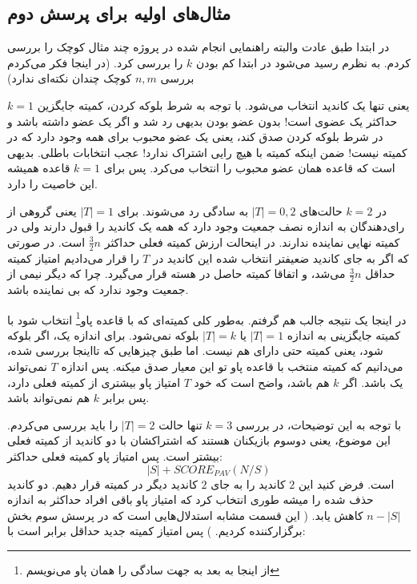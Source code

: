 \documentclass[12pt]{article}
\begin{document}
\subsection{مثال‌های اولیه برای پرسش دوم}
در ابتدا طبق عادت والبته راهنمایی انجام شده در پروژه چند مثال
کوچک را بررسی کردم. به نظرم رسید می‌شود در ابتدا کم بودن $k$
را بررسی کرد. (در اینجا فکر می‌کردم بررسی 
$n,m$ 
کوچک
چندان نکته‌ای ندارد)

 $k=1$
 یعنی تنها یک کاندید انتخاب می‌شود. با توجه به شرط بلوکه کردن،
 کمیته جایگزین حداکثر یک عضوی است! بدون عضو بودن بدیهی رد شد و
 اگر یک عضو  داشته باشد و در شرط بلوکه کردن صدق کند،
 یعنی یک عضو محبوب برای همه وجود دارد که در کمیته نیست! ضمن اینکه
 کمیته با هیچ رایی اشتراک ندارد! عجب انتخابات باطلی. بدیهی است که
 قاعده
 همان عضو محبوب را انتخاب می‌کرد. پس برای $k=1$ 
 قاعده همیشه این خاصیت را دارد.

 در $k=2$ حالت‌های 
 $|T| = 0, 2$
 به سادگی رد می‌شوند. برای 
 $|T| =1$ یعنی
 گروهی از رای‌دهندگان به اندازه نصف جمعیت وجود دارد که همه یک کاندید
  را قبول دارند ولی در کمیته نهایی نماینده ندارند. در اینحالت
  ارزش کمیته فعلی حداکثر $\frac{3}{2}n$
  است. در صورتی که اگر به جای کاندید ضعیفتر انتخاب شده
  این کاندید در $T$
  را قرار می‌دادیم امتیاز کمیته حداقل
  $\frac{3}{2}n$
  می‌شد، و اتفاقا کمیته حاصل در هسته قرار می‌گیرد. چرا که دیگر نیمی از جمعیت
  وجود ندارد که بی نماینده باشد.

  در اینجا یک نتیجه جالب هم گرفتم. به‌طور کلی کمیته‌ای که با
  قاعده پاو\footnote{از اینجا به بعد به جهت سادگی  را همان پاو می‌نویسم}
  انتخاب شود با کمیته جایگزینی به اندازه
  $|T| =1$
  یا 
  $|T| = k$
  بلوکه نمی‌شود. برای اندازه یک، اگر بلوکه شود، یعنی کمیته حتی دارای
  هم نیست. اما طبق چیزهایی که تااینجا بررسی شده، می‌دانیم که 
  کمیته منتخب با قاعده پاو تو این معیار صدق میکنه. پس اندازه
  $T$
  نمی‌تواند یک باشد. اگر $k$
  هم باشد، واضح است که خود $T$
  امتیاز پاو بیشتری از کمیته فعلی دارد، پس برابر $k$
  هم نمی‌تواند باشد.

  با توجه به این توضیحات، در بررسی $k =3$ تنها حالت
  $|T| = 2$ 
  را باید بررسی می‌کردم. این موضوع، یعنی دوسوم بازیکنان هستند که اشتراکشان
  با دو کاندید از کمیته فعلی بیشتر است.
  پس امتیاز پاو کمیته فعلی حداکثر:
  \begin{equation*}
    |S| + SCORE_{PAV} (N / S)
\end{equation*}
  است.
  فرض کنید این $2$ کاندید
  را به جای $2$
   کاندید دیگر در کمیته قرار دهیم.
  دو کاندید حذف شده را میشه طوری انتخاب کرد که
    امتیاز پاو باقی افراد حداکثر به اندازه 
    $n - |S|$
    کاهش یابد. 
    (
        این قسمت مشابه استدلال‌هایی است که در پرسش سوم بخش
        برگزارکننده کردیم.
    )
    پس امتیاز کمیته جدید حداقل برابر است با:
\end{document}
